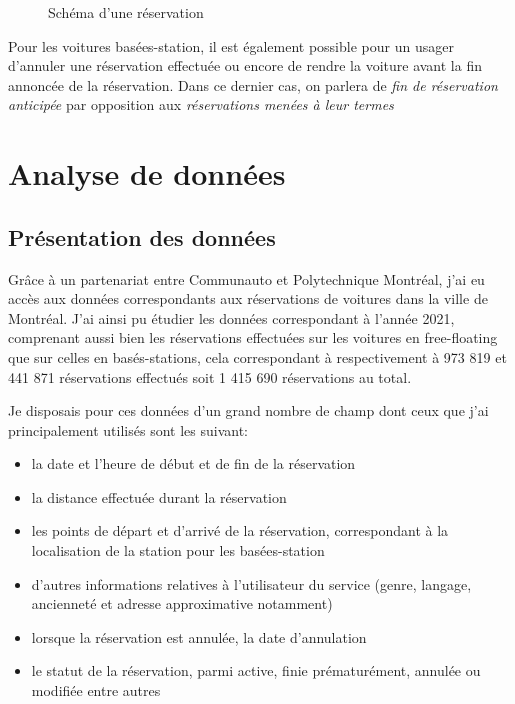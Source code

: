 \documentclass[12pt,a4paper]{article}
\theoremstyle{definition}
\begin{document}
\begin{figure}[h]
\centering
{}
\caption{Schéma d'une réservation}
\end{figure}

Pour les voitures basées-station, il est également possible pour un usager d'annuler une réservation effectuée ou encore de rendre la voiture avant la fin annoncée de la réservation. Dans ce dernier cas, on parlera de \emph{fin de réservation anticipée} par opposition aux \emph{réservations menées à leur termes}

\section{Analyse de données}
\subsection{Présentation des données}

Grâce à un partenariat entre Communauto et Polytechnique Montréal, j'ai eu accès aux données correspondants aux réservations de voitures dans la ville de Montréal. 
J'ai ainsi pu étudier les données correspondant à l'année 2021, comprenant  aussi bien les réservations effectuées sur les voitures en free-floating que sur celles en basés-stations, cela correspondant à respectivement à 973 819 et 441 871 réservations effectués soit 1 415 690 réservations au total.

Je disposais pour ces données d'un grand nombre de champ dont ceux que j'ai principalement utilisés sont les suivant:
\begin{itemize}
\item la date et l'heure de début et de fin de la réservation
\item la distance effectuée durant la réservation
\item les points de départ et d'arrivé de la réservation, correspondant à la localisation de la station pour les basées-station
\item d'autres informations relatives à l'utilisateur du service (genre, langage, ancienneté et adresse approximative notamment)
\item lorsque la réservation est annulée, la date d'annulation
\item le statut de la réservation, parmi active, finie prématurément, annulée ou modifiée entre autres
\end{itemize}
\end{document}
